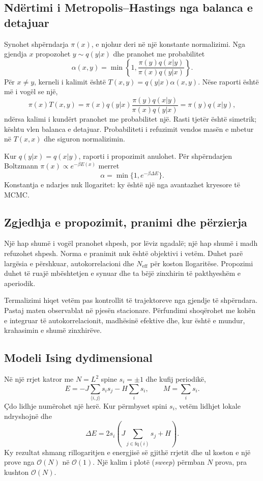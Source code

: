 \documentclass[11pt,oneside,openany]{book}
\newcommand{\Oh}{\mathcal{O}}
\begin{document}
\subsection{Ndërtimi i Metropolis--Hastings nga balanca e detajuar}
Synohet shpërndarja $\pi(x)$, e njohur deri në një konstante normalizimi. Nga gjendja $x$ propozohet $y\sim q(y|x)$ dhe pranohet me probabilitet
\begin{equation}
 \alpha(x,y)=\min\left\{1,
 \frac{\pi(y)q(x|y)}{\pi(x)q(y|x)}\right\}.
\end{equation}
Për $x\ne y$, kerneli i kalimit është $T(x,y)=q(y|x)\alpha(x,y)$. Nëse raporti është më i vogël se një,
\begin{equation}
 \pi(x)T(x,y)=\pi(x)q(y|x)
 \frac{\pi(y)q(x|y)}{\pi(x)q(y|x)}
 =\pi(y)q(x|y),
\end{equation}
ndërsa kalimi i kundërt pranohet me probabilitet një. Rasti tjetër është simetrik; kështu vlen balanca e detajuar. Probabiliteti i refuzimit vendos masën e mbetur në $T(x,x)$ dhe siguron normalizimin.

Kur $q(y|x)=q(x|y)$, raporti i propozimit anulohet. Për shpërndarjen Boltzmann $\pi(x)\propto e^{-\beta E(x)}$ merret
\begin{equation}
 \alpha=\min\{1,e^{-\beta\Delta E}\}.
\end{equation}
Konstantja e ndarjes nuk llogaritet: ky është një nga avantazhet kryesore të MCMC.

\subsection{Zgjedhja e propozimit, pranimi dhe përzierja}
Një hap shumë i vogël pranohet shpesh, por lëviz ngadalë; një hap shumë i madh refuzohet shpesh. Norma e pranimit nuk është objektivi i vetëm. Duhet parë largësia e përshkuar, autokorrelacioni dhe $N_{\mathrm{eff}}$ për koston llogaritëse. Propozimi duhet të ruajë mbështetjen e synuar dhe ta bëjë zinxhirin të pakthyeshëm e aperiodik.

Termalizimi hiqet vetëm pas kontrollit të trajektoreve nga gjendje të shpërndara. Pastaj maten observablat në pjesën stacionare. Përfundimi shoqërohet me kohën e integruar të autokorrelacionit, madhësinë efektive dhe, kur është e mundur, krahasimin e shumë zinxhirëve.

\subsection{Modeli Ising dydimensional}
Në një rrjet katror me $N=L^2$ spine $s_i=\pm1$ dhe kufij periodikë,
\begin{equation}
 E=-J\sum_{\langle i,j\rangle}s_is_j-H\sum_i s_i,
 \qquad M=\sum_i s_i.
\end{equation}
Çdo lidhje numërohet një herë. Kur përmbyset spini $s_i$, vetëm lidhjet lokale ndryshojnë dhe
\begin{equation}
 \Delta E=2s_i\left(J\sum_{j\in\mathrm{fq}(i)}s_j+H\right).
\end{equation}
Ky rezultat shmang rillogaritjen e energjisë së gjithë rrjetit dhe ul koston e një prove nga $\Oh(N)$ në $\Oh(1)$. Një kalim i plotë (\emph{sweep}) përmban $N$ prova, pra kushton $\Oh(N)$.
\end{document}
